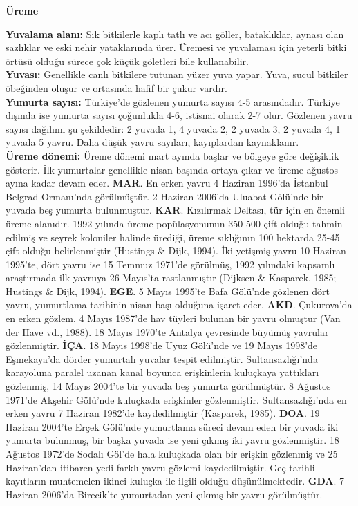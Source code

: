 \documentclass[
  a4paper,
  DIV=11,
  numbers=noendperiod]{scrreprt}
\begin{document}
\textbf{Üreme}

\textbf{Yuvalama alanı:} Sık bitkilerle kaplı tatlı ve acı göller,
bataklıklar, aynası olan sazlıklar ve eski nehir yataklarında ürer.
Üremesi ve yuvalaması için yeterli bitki örtüsü olduğu sürece çok küçük
göletleri bile kullanabilir.\\
\textbf{Yuvası:} Genellikle canlı bitkilere tutunan yüzer yuva yapar.
Yuva, sucul bitkiler öbeğinden oluşur ve ortasında hafif bir çukur
vardır.\\
\textbf{Yumurta sayısı:} Türkiye'de gözlenen yumurta sayısı 4-5
arasındadır. Türkiye dışında ise yumurta sayısı çoğunlukla 4-6, istisnai
olarak 2-7 olur. Gözlenen yavru sayısı dağılımı şu şekildedir: 2 yuvada
1, 4 yuvada 2, 2 yuvada 3, 2 yuvada 4, 1 yuvada 5 yavru. Daha düşük
yavru sayıları, kayıplardan kaynaklanır.\\
\textbf{Üreme dönemi:} Üreme dönemi mart ayında başlar ve bölgeye göre
değişiklik gösterir. İlk yumurtalar genellikle nisan başında ortaya
çıkar ve üreme ağustos ayına kadar devam eder. \textbf{MAR}. En erken
yavru 4 Haziran 1996'da İstanbul Belgrad Ormanı'nda görülmüştür. 2
Haziran 2006'da Uluabat Gölü'nde bir yuvada beş yumurta bulunmuştur.
\textbf{KAR}. Kızılırmak Deltası, tür için en önemli üreme alanıdır.
1992 yılında üreme popülasyonunun 350-500 çift olduğu tahmin edilmiş ve
seyrek koloniler halinde ürediği, üreme sıklığının 100 hektarda 25-45
çift olduğu belirlenmiştir (Hustings \& Dijk, 1994). İki yetişmiş yavru
10 Haziran 1995'te, dört yavru ise 15 Temmuz 1971'de görülmüş, 1992
yılındaki kapsamlı araştırmada ilk yavruya 26 Mayıs'ta rastlanmıştır
(Dijksen \& Kasparek, 1985; Hustings \& Dijk, 1994). \textbf{EGE}. 5
Mayıs 1995'te Bafa Gölü'nde gözlenen dört yavru, yumurtlama tarihinin
nisan başı olduğuna işaret eder. \textbf{AKD}. Çukurova'da en erken
gözlem, 4 Mayıs 1987'de hav tüyleri bulunan bir yavru olmuştur (Van der
Have vd., 1988). 18 Mayıs 1970'te Antalya çevresinde büyümüş yavrular
gözlenmiştir. \textbf{İÇA}. 18 Mayıs 1998'de Uyuz Gölü'nde ve 19 Mayıs
1998'de Eşmekaya'da dörder yumurtalı yuvalar tespit edilmiştir.
Sultansazlığı'nda karayoluna paralel uzanan kanal boyunca erişkinlerin
kuluçkaya yattıkları gözlenmiş, 14 Mayıs 2004'te bir yuvada beş yumurta
görülmüştür. 8 Ağustos 1971'de Akşehir Gölü'nde kuluçkada erişkinler
gözlenmiştir. Sultansazlığı'nda en erken yavru 7 Haziran 1982'de
kaydedilmiştir (Kasparek, 1985). \textbf{DOA}. 19 Haziran 2004'te Erçek
Gölü'nde yumurtlama süreci devam eden bir yuvada iki yumurta bulunmuş,
bir başka yuvada ise yeni çıkmış iki yavru gözlenmiştir. 18 Ağustos
1972'de Sodalı Göl'de hala kuluçkada olan bir erişkin gözlenmiş ve 25
Haziran'dan itibaren yedi farklı yavru gözlemi kaydedilmiştir. Geç
tarihli kayıtların muhtemelen ikinci kuluçka ile ilgili olduğu
düşünülmektedir. \textbf{GDA}. 7 Haziran 2006'da Birecik'te yumurtadan
yeni çıkmış bir yavru görülmüştür.
\end{document}
